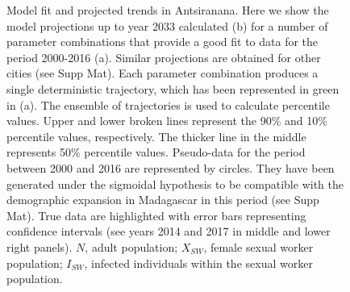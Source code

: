 \documentclass[preprint,12pt]{elsarticle}
\begin{document}
\begin{figure}[t]
	\caption{Model fit and projected trends in Antsiranana. Here we show the model projections up to year 2033 calculated (b) for a number of parameter combinations that provide a good fit to data for the period 2000-2016 (a). Similar projections are obtained for other cities (see Supp Mat). Each parameter combination produces a single deterministic trajectory, which has been represented in green in (a). The ensemble of trajectories is used to calculate percentile values. Upper and lower broken lines represent the 90\% and 10\% percentile values, respectively. The thicker line in the middle represents 50\% percentile values. Pseudo-data for the period between 2000 and 2016 are represented by circles. They have been generated under the sigmoidal hypothesis to be compatible with the demographic expansion in Madagascar in this period (see Supp Mat). True data are highlighted with error bars representing confidence intervals (see years 2014 and 2017 in middle and lower right panels). $N$, adult population; $X_{SW}$, female sexual worker population; $I_{SW}$, infected individuals within the sexual worker population.}
    \vspace{-1.0cm}
    \label{Fig_Antsiranana_Fitted-vs-Extrapolated}
\end{figure} 
\end{document}
